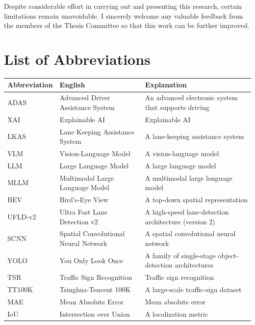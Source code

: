 \documentclass[12pt,a4paper]{report}
\begin{document}
Despite considerable effort in carrying out and presenting this research, certain limitations remain unavoidable. I sincerely welcome any valuable feedback from the members of the Thesis Committee so that this work can be further improved.

\clearpage
\tableofcontents

\clearpage
\listoftables
{}

\clearpage
\listoffigures
{}

\clearpage
\chapter*{List of Abbreviations}
\begin{longtable}{@{}p{2.2cm}p{4.2cm}p{7.5cm}@{}}
    \toprule
    \textbf{Abbreviation} & \textbf{English} & \textbf{Explanation} \\
    \midrule
    \endhead
    ADAS & Advanced Driver Assistance System & An advanced electronic system that supports driving \\
    XAI & Explainable AI & Explainable AI \\
    LKAS & Lane Keeping Assistance System & A lane-keeping assistance system \\
    VLM & Vision-Language Model & A vision-language model \\
    LLM & Large Language Model & A large language model \\
    MLLM & Multimodal Large Language Model & A multimodal large language model \\
    BEV & Bird's-Eye View & A top-down spatial representation \\
    UFLD-v2 & Ultra Fast Lane Detection v2 & A high-speed lane-detection architecture (version 2) \\
    SCNN & Spatial Convolutional Neural Network & A spatial convolutional neural network \\
    YOLO & You Only Look Once & A family of single-stage object-detection architectures \\
    TSR & Traffic Sign Recognition & Traffic sign recognition \\
    TT100K & Tsinghua-Tencent 100K & A large-scale traffic-sign dataset \\
    MAE & Mean Absolute Error & Mean absolute error \\
    IoU & Intersection over Union & A localization metric \\

\end{longtable}
\end{document}
